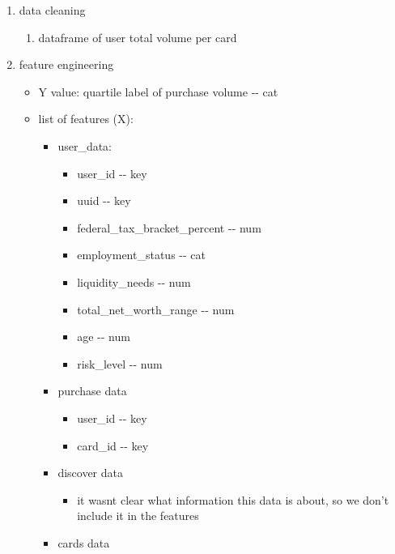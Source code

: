 \documentclass[11pt]{article}
\providecommand{\tightlist}{%
      \setlength{\itemsep}{0pt}\setlength{\parskip}{0pt}}
\begin{document}
\begin{enumerate}
\def\labelenumi{\arabic{enumi}.}
\tightlist
\item
  data cleaning

  \begin{enumerate}
  \def\labelenumii{\arabic{enumii}.}
  \tightlist
  \item
    dataframe of user total volume per card
  \end{enumerate}
\item
  feature engineering

  \begin{itemize}
  \tightlist
  \item
    Y value: quartile label of purchase volume -\/- cat
  \item
    list of features (X):

    \begin{itemize}
    \tightlist
    \item
      user\_data:

      \begin{itemize}
      \tightlist
      \item
        user\_id -\/- key
      \item
        uuid -\/- key
      \item
        federal\_tax\_bracket\_percent -\/- num
      \item
        employment\_status -\/- cat
      \item
        liquidity\_needs -\/- num
      \item
        total\_net\_worth\_range -\/- num
      \item
        age -\/- num
      \item
        risk\_level -\/- num
      \end{itemize}
    \item
      purchase data

      \begin{itemize}
      \tightlist
      \item
        user\_id -\/- key
      \item
        card\_id -\/- key
      \end{itemize}
    \item
      discover data

      \begin{itemize}
      \tightlist
      \item
        it wasnt clear what information this data is about, so we don't
        include it in the features
      \end{itemize}
    \item
      cards data


\end{itemize}
\end{itemize}
\end{enumerate}
\end{document}
